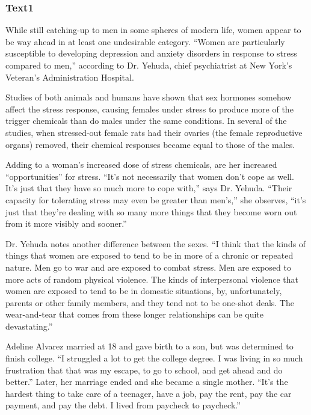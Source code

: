 \documentclass[a4paper]{article}
\begin{document}
\subsubsection{Text1}

\par
While still catching-up to men in some spheres of modern life, women appear to be way ahead in at least one undesirable category. “Women are particularly susceptible to developing depression and anxiety disorders in response to stress compared to men,” according to Dr. Yehuda, chief psychiatrist at New York’s Veteran’s Administration Hospital.

\par
Studies of both animals and humans have shown that sex hormones somehow affect the stress response, causing females under stress to produce more of the trigger chemicals than do males under the same conditions. In several of the studies, when stressed-out female rats had their ovaries (the female reproductive organs) removed, their chemical responses became equal to those of the males.

\par
Adding to a woman’s increased dose of stress chemicals, are her increased “opportunities” for stress. “It’s not necessarily that women don’t cope as well. It’s just that they have so much more to cope with,” says Dr. Yehuda. “Their capacity for tolerating stress may even be greater than men’s,” she observes, “it’s just that they’re dealing with so many more things that they become worn out from it more visibly and sooner.”

\par
Dr. Yehuda notes another difference between the sexes. “I think that the kinds of things that women are exposed to tend to be in more of a chronic or repeated nature. Men go to war and are exposed to combat stress. Men are exposed to more acts of random physical violence. The kinds of interpersonal violence that women are exposed to tend to be in domestic situations, by, unfortunately, parents or other family members, and they tend not to be one-shot deals. The wear-and-tear that comes from these longer relationships can be quite devastating.”

\par
Adeline Alvarez married at 18 and gave birth to a son, but was determined to finish college. “I struggled a lot to get the college degree. I was living in so much frustration that that was my escape, to go to school, and get ahead and do better.” Later, her marriage ended and she became a single mother. “It’s the hardest thing to take care of a teenager, have a job, pay the rent, pay the car payment, and pay the debt. I lived from paycheck to paycheck.”
\end{document}
